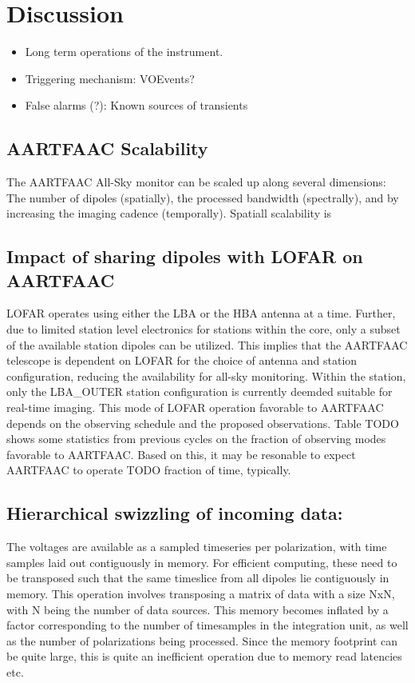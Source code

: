 \documentclass{aa}
\begin{document}
\section {\label{sec:discussion} Discussion}
\begin {itemize}
 \item {Long term operations of the instrument.}
 \item {Triggering mechanism: VOEvents?}
 \item {False alarms (?): Known sources of transients}
\end {itemize}

\subsection {AARTFAAC Scalability}
The AARTFAAC  All-Sky monitor  can be  scaled up  along several  dimensions: The
number  of dipoles  (spatially), the  processed bandwidth  (spectrally), and  by
increasing the imaging cadence (temporally). Spatiall scalability is 

\subsection {\label{subsec:impact_lofar} Impact of sharing dipoles with LOFAR on AARTFAAC}
LOFAR operates using either  the LBA or the HBA antenna at  a time. Further, due
to limited station level electronics for stations within the core, only a subset
of the available station dipoles can be utilized. This implies that the AARTFAAC
telescope  is  dependent  on  LOFAR  for  the  choice  of  antenna  and  station
configuration,  reducing the  availability  for all-sky  monitoring. Within  the
station, only the LBA\_OUTER station configuration is currently deemded suitable
for  real-time imaging.   This mode  of  LOFAR operation  favorable to  AARTFAAC
depends on  the observing  schedule and the  proposed observations.   Table TODO
shows some  statistics from previous cycles  on the fraction of  observing modes
favorable to AARTFAAC. Based on this, it  may be resonable to expect AARTFAAC to
operate TODO fraction of time, typically.

\subsection {Hierarchical swizzling of incoming data:} The voltages are available as
a sampled timeseries  per polarization, with time samples  laid out contiguously
in memory.  For  efficient computing, these need to be  transposed such that the
same  timeslice from  all dipoles  lie  contiguously in  memory. This  operation
involves transposing a matrix  of data with a size NxN, with  N being the number
of data sources.  This memory becomes  inflated by a factor corresponding to the
number  of  timesamples in  the  integration  unit, as  well  as  the number  of
polarizations being  processed. Since the  memory footprint can be  quite large,
this is quite an inefficient operation due to memory read latencies etc.\\
\end{document}
